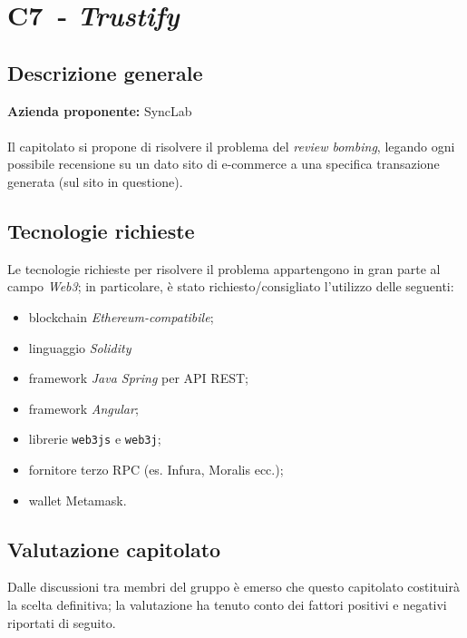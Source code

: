 
\renewcommand{\capName}{\textit{Trustify}} %
\renewcommand{\capCode}{C7} %
\renewcommand{\capLink}{https://www.math.unipd.it/~tullio/IS-1/2022/Progetto/C7.pdf} %
\renewcommand{\capProposer}{SyncLab} %


\section{\capCode\ - \capName}
\subsection{Descrizione generale}
\textbf{Azienda proponente:} SyncLab\\
\\
Il capitolato si propone di risolvere il problema del \textit{review bombing}, legando ogni possibile recensione su un dato sito di e-commerce a una specifica transazione generata (sul sito in questione).

\subsection{Tecnologie richieste}
Le tecnologie richieste per risolvere il problema appartengono in gran parte al campo \textit{Web3}; in particolare, è stato richiesto/consigliato l'utilizzo delle seguenti:
\begin{itemize}
    \item blockchain \textit{Ethereum-compatibile};
    \item linguaggio \textit{Solidity}
    \item framework \textit{Java Spring} per API REST;
    \item framework \textit{Angular};
    \item librerie \texttt{web3js} e \texttt{web3j};
    \item fornitore terzo RPC (es. Infura, Moralis ecc.);
    \item wallet Metamask.
\end{itemize}
\subsection{Valutazione capitolato}
Dalle discussioni tra membri del gruppo è emerso che questo capitolato costituirà la scelta definitiva; la valutazione ha tenuto conto dei fattori positivi e negativi riportati di seguito.

